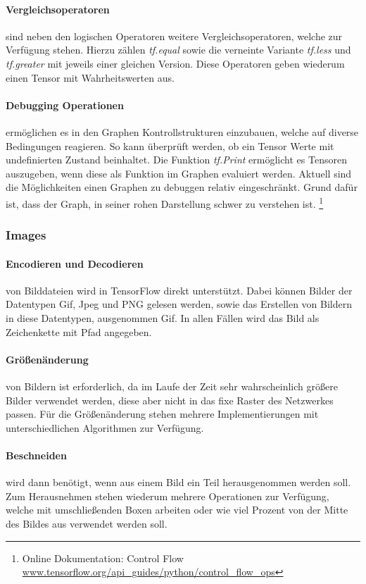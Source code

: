 \paragraph{Vergleichsoperatoren} sind neben den logischen Operatoren weitere Vergleichsoperatoren, welche zur Verfügung stehen. 
Hierzu zählen \textit{tf.equal} sowie die verneinte Variante \textit{tf.less} und \textit{tf.greater} mit jeweils einer gleichen Version. 
Diese Operatoren geben wiederum einen Tensor mit Wahrheitswerten aus.

\paragraph{Debugging Operationen} ermöglichen es in den Graphen Kontrollstrukturen einzubauen, welche auf diverse Bedingungen reagieren.
So kann überprüft werden, ob ein Tensor Werte mit undefinierten Zustand beinhaltet. 
Die Funktion \textit{tf.Print} ermöglicht es Tensoren auszugeben, wenn diese als Funktion im Graphen evaluiert werden. 
Aktuell sind die Möglichkeiten einen Graphen zu debuggen relativ eingeschränkt. 
Grund dafür ist, dass der Graph, in seiner rohen Darstellung schwer zu verstehen ist. \footnote{Online Dokumentation: Control Flow \url{www.tensorflow.org/api_guides/python/control_flow_ops}}

\subsubsection{Images}

\paragraph{Encodieren und Decodieren} von Bilddateien wird in TensorFlow direkt unterstützt.
Dabei können Bilder der Datentypen Gif, Jpeg und PNG gelesen werden, sowie das Erstellen von Bildern in diese Datentypen, ausgenommen Gif.
In allen Fällen wird das Bild als Zeichenkette mit Pfad angegeben. 

\paragraph{Größenänderung} von Bildern ist erforderlich, da im Laufe der Zeit sehr wahrscheinlich größere Bilder verwendet werden, diese aber nicht in das fixe Raster des Netzwerkes passen. 
Für die Größenänderung stehen mehrere Implementierungen mit unterschiedlichen Algorithmen zur Verfügung.

\paragraph{Beschneiden} wird dann benötigt, wenn aus einem Bild ein Teil herausgenommen werden soll. 
Zum Herausnehmen stehen wiederum mehrere Operationen zur Verfügung, welche mit umschließenden Boxen arbeiten oder wie viel Prozent von der Mitte des Bildes aus verwendet werden soll.


